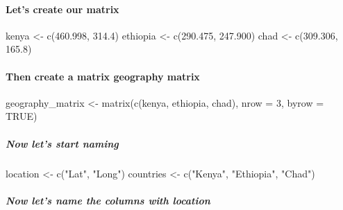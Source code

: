 \documentclass[
]{article}
\newenvironment{Shaded}{\begin{snugshade}}{\end{snugshade}}
\newcommand{\AttributeTok}[1]{\textcolor[rgb]{0.77,0.63,0.00}{#1}}
\newcommand{\ConstantTok}[1]{\textcolor[rgb]{0.00,0.00,0.00}{#1}}
\newcommand{\DecValTok}[1]{\textcolor[rgb]{0.00,0.00,0.81}{#1}}
\newcommand{\FloatTok}[1]{\textcolor[rgb]{0.00,0.00,0.81}{#1}}
\newcommand{\FunctionTok}[1]{\textcolor[rgb]{0.00,0.00,0.00}{#1}}
\newcommand{\NormalTok}[1]{#1}
\newcommand{\OtherTok}[1]{\textcolor[rgb]{0.56,0.35,0.01}{#1}}
\newcommand{\StringTok}[1]{\textcolor[rgb]{0.31,0.60,0.02}{#1}}
\begin{document}
\hypertarget{lets-create-our-matrix}{%
\paragraph{Let's create our matrix}\label{lets-create-our-matrix}}

\begin{Shaded}
\begin{Highlighting}[]
\NormalTok{kenya }\OtherTok{\textless{}{-}} \FunctionTok{c}\NormalTok{(}\FloatTok{460.998}\NormalTok{, }\FloatTok{314.4}\NormalTok{) }
\NormalTok{ethiopia }\OtherTok{\textless{}{-}} \FunctionTok{c}\NormalTok{(}\FloatTok{290.475}\NormalTok{, }\FloatTok{247.900}\NormalTok{) }
\NormalTok{chad }\OtherTok{\textless{}{-}} \FunctionTok{c}\NormalTok{(}\FloatTok{309.306}\NormalTok{, }\FloatTok{165.8}\NormalTok{)}
\end{Highlighting}
\end{Shaded}

\hypertarget{then-create-a-matrix-geography-matrix}{%
\paragraph{Then create a matrix geography
matrix}\label{then-create-a-matrix-geography-matrix}}

\begin{Shaded}
\begin{Highlighting}[]
\NormalTok{geography\_matrix }\OtherTok{\textless{}{-}} \FunctionTok{matrix}\NormalTok{(}\FunctionTok{c}\NormalTok{(kenya, ethiopia, chad), }\AttributeTok{nrow =} \DecValTok{3}\NormalTok{, }\AttributeTok{byrow =} \ConstantTok{TRUE}\NormalTok{)}
\end{Highlighting}
\end{Shaded}

\hypertarget{now-lets-start-naming}{%
\subparagraph{Now let's start naming}\label{now-lets-start-naming}}

\begin{Shaded}
\begin{Highlighting}[]
\NormalTok{location }\OtherTok{\textless{}{-}} \FunctionTok{c}\NormalTok{(}\StringTok{"Lat"}\NormalTok{, }\StringTok{"Long"}\NormalTok{)}
\NormalTok{countries }\OtherTok{\textless{}{-}} \FunctionTok{c}\NormalTok{(}\StringTok{"Kenya"}\NormalTok{, }\StringTok{"Ethiopia"}\NormalTok{, }\StringTok{"Chad"}\NormalTok{)}
\end{Highlighting}
\end{Shaded}

\hypertarget{now-lets-name-the-columns-with-location}{%
\subparagraph{Now let's name the columns with
location}\label{now-lets-name-the-columns-with-location}}
\end{document}
